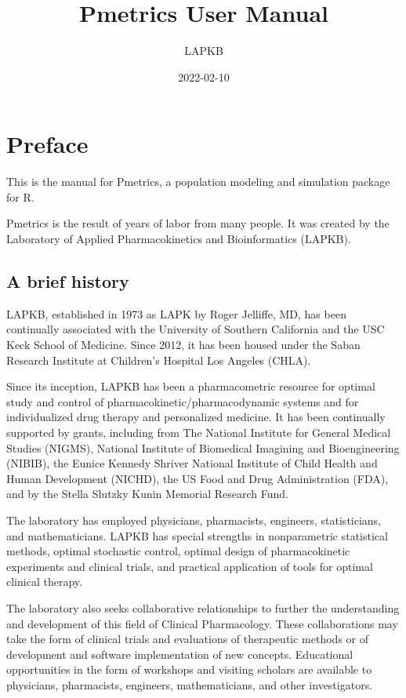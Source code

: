 \documentclass[
]{book}
\title{Pmetrics User Manual}
\author{LAPKB}
\date{2022-02-10}
\begin{document}
\maketitle

{
\setcounter{tocdepth}{1}
\tableofcontents
}
\hypertarget{preface}{%
\chapter{Preface}\label{preface}}

This is the manual for Pmetrics, a population modeling and simulation package for R.

Pmetrics is the result of years of labor from many people. It was created by the Laboratory of Applied Pharmacokinetics and Bioinformatics (LAPKB).

\hypertarget{a-brief-history}{%
\section{A brief history}\label{a-brief-history}}

LAPKB, established in 1973 as LAPK by Roger Jelliffe, MD, has been continually associated with the University of Southern California and the USC Keck School of Medicine. Since 2012, it has been housed under the Saban Research Institute at Children's Hospital Los Angeles (CHLA).

Since its inception, LAPKB has been a pharmacometric resource for optimal study and control of pharmacokinetic/pharmacodynamic systems and for individualized drug therapy and personalized medicine. It has been continually supported by grants, including from The National Institute for General Medical Studies (NIGMS), National Institute of Biomedical Imagining and Bioengineering (NIBIB), the Eunice Kennedy Shriver National Institute of Child Health and Human Development (NICHD), the US Food and Drug Administration (FDA), and by the Stella Slutzky Kunin Memorial Research Fund.

The laboratory has employed physicians, pharmacists, engineers, statisticians, and mathematicians. LAPKB has special strengths in nonparametric statistical methods, optimal stochastic control, optimal design of pharmacokinetic experiments and clinical trials, and practical application of tools for optimal clinical therapy.

The laboratory also seeks collaborative relationships to further the understanding and development of this field of Clinical Pharmacology. These collaborations may take the form of clinical trials and evaluations of therapeutic methods or of development and software implementation of new concepts. Educational opportunities in the form of workshops and visiting scholars are available to physicians, pharmacists, engineers, mathematicians, and other investigators.
\end{document}
